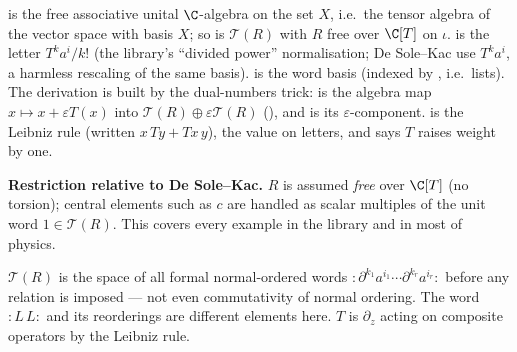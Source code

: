 \begin{dictionary}
 is the free associative unital $\C$-algebra on the set $X$, i.e.\ the tensor algebra of the vector
space with basis $X$; so  is $\mathcal T(R)$ with $R$ free over $\C[T]$ on $\iota$.  is the
letter $T^ka^i/k!$ (the library's ``divided power'' normalisation; De Sole--Kac use $T^ka^i$, a harmless rescaling of the
same basis).  is the word basis (indexed by , i.e.\ lists). The derivation is built by the
dual-numbers trick:  is the algebra map $x\mapsto x+\varepsilon T(x)$ into $\mathcal T(R)\oplus\varepsilon\mathcal T(R)$
(), and  is its $\varepsilon$-component.  is the Leibniz rule (written
$x\,Ty + Tx\,y$),  the value on letters, and  says $T$ raises weight by one.

\textbf{Restriction relative to De Sole--Kac.} $R$ is assumed \emph{free} over $\C[T]$ (no torsion); central elements
such as $c$ are handled as scalar multiples of the unit word $1\in\mathcal T(R)$. This covers every example in the
library and in most of physics.
\end{dictionary}

\begin{physics}
$\mathcal T(R)$ is the space of all formal normal-ordered words ${:}\partial^{k_1}a^{i_1}\cdots\partial^{k_r}a^{i_r}{:}$
before any relation is imposed --- not even commutativity of normal ordering. The word ${:}L\,L{:}$ and its reorderings are
different elements here. $T$ is $\partial_z$ acting on composite operators by the Leibniz rule.
\end{physics}

